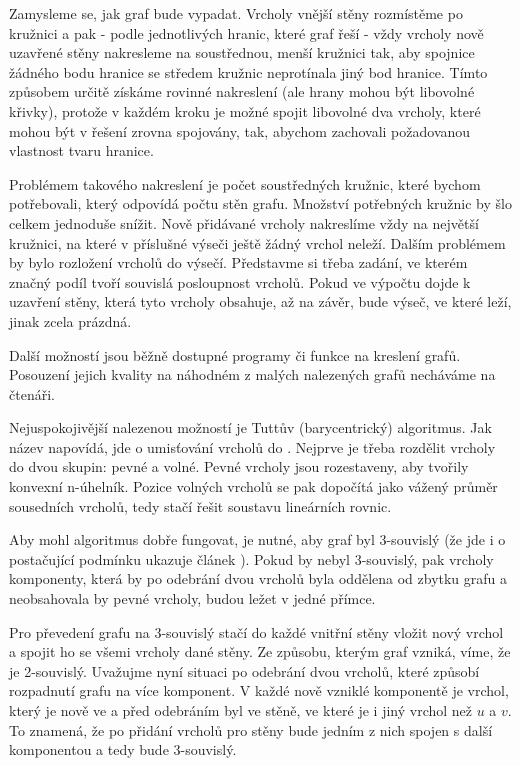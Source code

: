 Zamysleme se, jak graf bude vypadat. Vrcholy vnější stěny rozmístěme po kružnici a pak - podle jednotlivých hranic, které graf řeší - vždy vrcholy nově uzavřené stěny nakresleme na soustřednou, menší kružnici tak, aby spojnice žádného bodu hranice se středem kružnic neprotínala jiný bod hranice. Tímto způsobem určitě získáme rovinné nakreslení (ale hrany mohou být libovolné křivky), protože v každém kroku je možné spojit libovolné dva vrcholy, které mohou být v řešení zrovna spojovány, tak, abychom zachovali požadovanou vlastnost tvaru hranice.

Problémem takového nakreslení je počet soustředných kružnic, které bychom potřebovali, který odpovídá počtu stěn grafu. Množství potřebných kružnic by šlo celkem jednoduše snížit. Nově přidávané vrcholy nakreslíme vždy na největší kružnici, na které v příslušné výseči ještě žádný vrchol neleží. Dalším problémem by bylo rozložení vrcholů do výsečí. Představme si třeba zadání, ve kterém značný podíl tvoří souvislá posloupnost  vrcholů. Pokud ve výpočtu dojde k uzavření stěny, která tyto vrcholy obsahuje, až na závěr, bude výseč, ve které leží, jinak zcela prázdná.

Další možností jsou běžně dostupné programy či funkce na kreslení grafů. Posouzení jejich kvality na náhodném z malých nalezených grafů necháváme na čtenáři.

Nejuspokojivější nalezenou možností je Tuttův (barycentrický) algoritmus. Jak název napovídá, jde o umisťování vrcholů do . Nejprve je třeba rozdělit vrcholy do dvou skupin: pevné a volné. Pevné vrcholy jsou rozestaveny, aby tvořily konvexní n-úhelník. Pozice volných vrcholů se pak dopočítá jako vážený průměr sousedních vrcholů, tedy stačí řešit soustavu lineárních rovnic.

Aby mohl algoritmus dobře fungovat, je nutné, aby graf byl 3-souvislý (že jde i o postačující podmínku ukazuje článek  \cite{Tutte}). Pokud by nebyl 3-souvislý, pak vrcholy komponenty, která by po odebrání dvou vrcholů byla oddělena od zbytku grafu a neobsahovala by pevné vrcholy, budou ležet v jedné přímce.

Pro převedení grafu na 3-souvislý stačí do každé vnitřní stěny vložit nový vrchol a spojit ho se všemi vrcholy dané stěny. Ze způsobu, kterým graf vzniká, víme, že je 2-souvislý. Uvažujme nyní situaci po odebrání dvou vrcholů, které způsobí rozpadnutí grafu na více komponent. V každé nově vzniklé komponentě je vrchol, který je nově ve  a před odebráním byl ve stěně, ve které je i jiný vrchol než $u$ a $v$. To znamená, že po přidání vrcholů pro stěny bude jedním z nich spojen s další komponentou a tedy bude 3-souvislý. 

